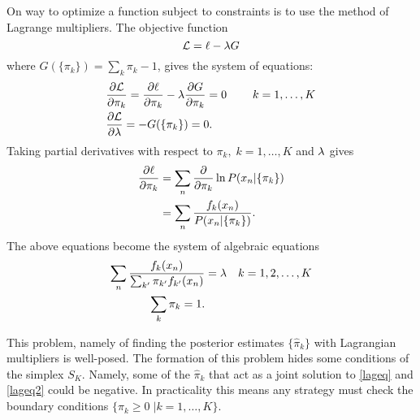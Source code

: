 On way to optimize a function subject to constraints is to use the method of Lagrange multipliers. The objective function 
\[\mathcal{L}=\ell-\lambda G\]
where $G(\{\pi_k\})=\sum_k \pi_k -1$, gives the system of equations:
\begin{align*}
&\pder1{\mathcal{L}}{\pi_k}=\pder1{\ell}{\pi_k}-\gl \pder1{G}{\pi_k}=0\qquad \; k=1,\ldots, K\\
&\pder1{\mathcal{L}}{\gl}=-G(\{\pi_k\})=0.
\end{align*}
Taking partial derivatives with respect to \( \pi_k,\;k=1,\ldots,K \) and \( \lambda \) gives
\begin{align*}
\pder1{\ell}{\pi_k}&=\sum_n \pder1{}{\pi_k}\ln P(x_n|\{\pi_k\})\\
&=\sum_n \frac{f_k(x_n)}{P(x_n|\{\pi_k\})}.
\end{align*}
The above equations become the system of algebraic equations
\begin{align}\label{lageq}
\sum_n\frac{f_k(x_n)}{\sum_{k'}\pi_{k'}f_{k'}(x_n)}&=\lambda&k=1,2,\ldots, K\\
\sum_k\pi_k=1.\label{lageq2}
\end{align}

This problem, namely of finding the posterior estimates $\{\hat{\pi}_k\}$ with Lagrangian multipliers is well-posed.  The formation of this problem hides some conditions of the simplex $S_K$.  Namely, some of the $\hat{\pi}_k$ that act as a joint solution to \eqref{lageq} and \eqref{lageq2} could be negative. In practicality this means any strategy must check the boundary conditions \( \{\pi_k\geq 0\; |k=1,\ldots,K \}   \).


